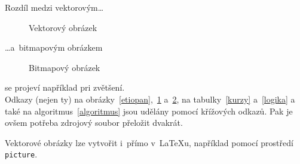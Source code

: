 \documentclass[a4paper,11pt]{article}
\begin{document}
\newpage
Rozdíl medzi vektorovým\dots

\begin{figure}[h]
\begin{center}
\caption{Vektorový obrázek}
\label{vektor}
\end{center}
\end{figure}

\dots a~bitmapovým obrázkem

\begin{figure}[h]
\begin{center}
\caption{Bitmapový obrázek}
\label{bitmap}
\end{center}
\end{figure}

se projeví například pri zvětšení.\\
Odkazy (nejen ty) na obrázky~\ref{etiopan},~\ref{vektor} a~\ref{bitmap}, na  
tabulky~\ref{kurzy} a~\ref{logika} a také na algoritmus~\ref{algoritmus} jsou udělány pomocí 
křížových odkazů. Pak je ovšem potřeba zdrojový soubor přeložit dvakrát.
\quad

Vektorové obrázky lze vytvořit i~přímo v~\LaTeX u, například pomocí prostředí 
\verb/picture/.
\end{document}
